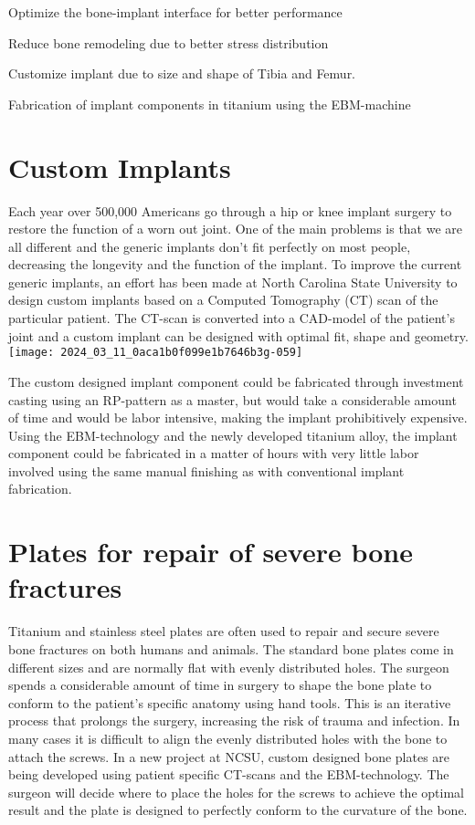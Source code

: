 \documentclass[10pt]{article}
\begin{document}
Optimize the bone-implant interface for better performance

Reduce bone remodeling due to better stress distribution

Customize implant due to size and shape of Tibia and Femur.

Fabrication of implant components in titanium using the EBM-machine

\section*{Custom Implants}
Each year over 500,000 Americans go through a hip or knee implant surgery to restore the function of a worn out joint. One of the main problems is that we are all different and the generic implants don't fit perfectly on most people, decreasing the longevity and the function of the implant. To improve the current generic implants, an effort has been made at North Carolina State University to design custom implants based on a Computed Tomography (CT) scan of the particular patient. The CT-scan is converted into a CAD-model of the patient's joint and a custom implant can be designed with optimal fit, shape and geometry.\\
\texttt{[image: 2024\_03\_11\_0aca1b0f099e1b7646b3g-059]}

The custom designed implant component could be fabricated through investment casting using an RP-pattern as a master, but would take a considerable amount of time and would be labor intensive, making the implant prohibitively expensive. Using the EBM-technology and the newly developed titanium alloy, the implant component could be fabricated in a matter of hours with very little labor involved using the same manual finishing as with conventional implant fabrication.

\section*{Plates for repair of severe bone fractures}
Titanium and stainless steel plates are often used to repair and secure severe bone fractures on both humans and animals. The standard bone plates come in different sizes and are normally flat with evenly distributed holes. The surgeon spends a considerable amount of time in surgery to shape the bone plate to conform to the patient's specific anatomy using hand tools. This is an iterative process that prolongs the surgery, increasing the risk of trauma and infection. In many cases it is difficult to align the evenly distributed holes with the bone to attach the screws. In a new project at NCSU, custom designed bone plates are being developed using patient specific CT-scans and the EBM-technology. The surgeon will decide where to place the holes for the screws to achieve the optimal result and the plate is designed to perfectly conform to the curvature of the bone.
\end{document}
